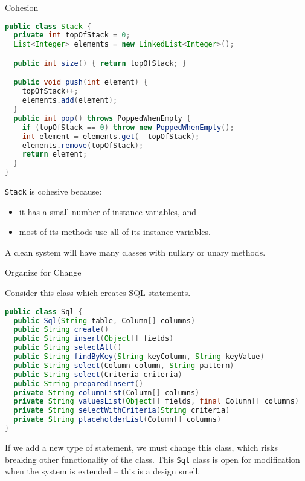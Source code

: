 \documentclass{beamer}
\begin{document}
\begin{frame}[fragile]{Cohesion}

\vspace{-.1in}
\begin{lstlisting}[language=Java]
public class Stack {
  private int topOfStack = 0;
  List<Integer> elements = new LinkedList<Integer>();

  public int size() { return topOfStack; }

  public void push(int element) {
    topOfStack++;
    elements.add(element);
  }
  public int pop() throws PoppedWhenEmpty {
    if (topOfStack == 0) throw new PoppedWhenEmpty();
    int element = elements.get(--topOfStack);
    elements.remove(topOfStack);
    return element;
  }
}
\end{lstlisting}
\vspace{-.1in}
{\tt Stack} is cohesive because:
\vspace{-.05in}
\begin{itemize}
\item it has a small number of instance variables, and
\item most of its methods use all of its instance variables.
\end{itemize}
A clean system will have many classes with nullary or unary methods.

\end{frame}


\begin{frame}[fragile]{Organize for Change}


Consider this class which creates SQL statements.
\begin{lstlisting}[language=Java]
public class Sql {
  public Sql(String table, Column[] columns)
  public String create()
  public String insert(Object[] fields)
  public String selectAll()
  public String findByKey(String keyColumn, String keyValue)
  public String select(Column column, String pattern)
  public String select(Criteria criteria)
  public String preparedInsert()
  private String columnList(Column[] columns)
  private String valuesList(Object[] fields, final Column[] columns)
  private String selectWithCriteria(String criteria)
  private String placeholderList(Column[] columns)
}
\end{lstlisting}


If we add a new type of statement, we must change this class, which risks breaking other functionality of the class.  This {\tt Sql} class is open for modification when the system is extended -- this is a design smell.


\end{frame}
\end{document}
